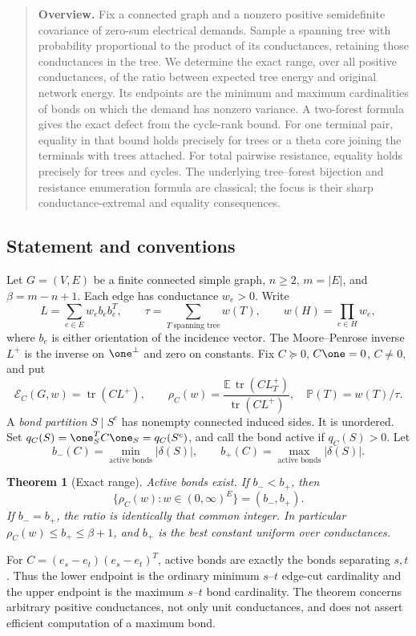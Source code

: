\documentclass[11pt,a4paper]{article}
\newtheorem{theorem}{Theorem}[section]
\theoremstyle{definition}\newtheorem{definition}[theorem]{Definition}
\theoremstyle{remark}\newtheorem{remark}[theorem]{Remark}
\DeclareMathOperator{\tr}{tr}\DeclareMathOperator{\supp}{supp}\DeclareMathOperator{\TV}{TV}
\numberwithin{equation}{section}
\begin{document}
\begin{quote}\small\textbf{Overview.} Fix a connected graph and a nonzero positive semidefinite covariance of zero-sum electrical demands. Sample a spanning tree with probability proportional to the product of its conductances, retaining those conductances in the tree. We determine the exact range, over all positive conductances, of the ratio between expected tree energy and original network energy. Its endpoints are the minimum and maximum cardinalities of bonds on which the demand has nonzero variance. A two-forest formula gives the exact defect from the cycle-rank bound. For one terminal pair, equality in that bound holds precisely for trees or a theta core joining the terminals with trees attached. For total pairwise resistance, equality holds precisely for trees and cycles. The underlying tree--forest bijection and resistance enumeration formula are classical; the focus is their sharp conductance-extremal and equality consequences.\end{quote}
\subsection{Statement and conventions}\label{T06-sec-1}
Let $G=(V,E)$ be a finite connected simple graph, $n\ge2$, $m=|E|$, and $\beta=m-n+1$. Each edge has conductance $w_e>0$. Write
\[
 L=\sum_{e\in E}w_e b_e b_e^T,\qquad \tau=\sum_{T\text{ spanning tree}}w(T),\qquad w(H)=\prod_{e\in H}w_e,
\]
where $b_e$ is either orientation of the incidence vector. The Moore--Penrose inverse $L^+$ is the inverse on $\one^\perp$ and zero on constants. Fix $C\succeq0$, $C\one=0$, $C\ne0$, and put
\[
 \mathcal E_C(G,w)=\tr(CL^+),\qquad
 \rho_C(w)=\frac{\mathbb E\,\tr(CL_T^+)}{\tr(CL^+)},
 \quad \mathbb P(T)=w(T)/\tau.
\]
A \emph{bond partition} $S\mid S^c$ has nonempty connected induced sides. It is unordered. Set $q_C(S)=\one_S^TC\one_S=q_C(S^c)$, and call the bond active if $q_C(S)>0$. Let
\[
 b_-(C)=\min_{\text{active bonds}}|\delta(S)|,\qquad
 b_+(C)=\max_{\text{active bonds}}|\delta(S)|.
\]
\begin{theorem}[Exact range]\label{T06-range}
Active bonds exist. If $b_-<b_+$, then
\[
 \{\rho_C(w):w\in(0,\infty)^E\}=(b_-,b_+).
\]
If $b_-=b_+$, the ratio is identically that common integer. In particular $\rho_C(w)\le b_+\le\beta+1$, and $b_+$ is the best constant uniform over conductances.
\end{theorem}
For $C=(e_s-e_t)(e_s-e_t)^T$, active bonds are exactly the bonds separating $s,t$. Thus the lower endpoint is the ordinary minimum $s$--$t$ edge-cut cardinality and the upper endpoint is the maximum $s$--$t$ bond cardinality. The theorem concerns arbitrary positive conductances, not only unit conductances, and does not assert efficient computation of a maximum bond.
\end{document}
